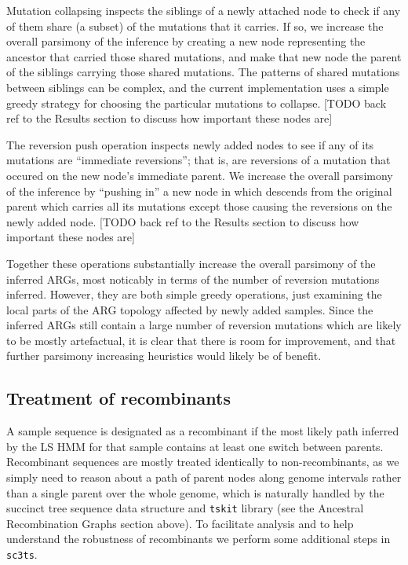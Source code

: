 \documentclass{article}
\begin{document}
Mutation collapsing inspects the siblings of a newly attached node
to check if any of them share (a subset) of the mutations that
it carries. If so, we increase the overall parsimony of the inference
by creating a new node representing the ancestor that carried
those shared mutations, and make that new node the parent of the
siblings carrying those shared mutations. The patterns of
shared mutations between siblings can be complex, and the current
implementation uses a simple greedy strategy for choosing
the particular mutations to collapse. [TODO back ref to the
Results section to discuss how important these nodes are]

The reversion push operation inspects newly added nodes to see
if any of its mutations are ``immediate reversions''; that is,
are reversions of a mutation that occured on the new node's
immediate parent. We increase the overall parsimony of the
inference by ``pushing in'' a new node in which descends from the
original parent which carries all its mutations except those
causing the reversions on the newly added node.
[TODO back ref to the
Results section to discuss how important these nodes are]

Together these operations substantially increase the overall parsimony
of the inferred ARGs, most noticably in terms of the number of
reversion mutations inferred. However, they are both simple
greedy operations, just examining the local parts of the
ARG topology affected by newly added samples. Since the inferred
ARGs still contain a large number of reversion mutations which
are likely to be mostly artefactual, it is clear that there
is room for improvement, and that further parsimony increasing
heuristics would likely be of benefit.

\subsection{Treatment of recombinants}
A sample sequence is designated as a recombinant if the most likely
path inferred by the LS HMM for that sample contains at least
one switch between parents. Recombinant sequences are mostly treated
identically to non-recombinants, as we simply need to reason about
a path of parent nodes along genome intervals rather than a
single parent over the whole genome, which is naturally handled by
the succinct tree sequence data structure and \texttt{tskit} library
(see the Ancestral Recombination Graphs section above). To facilitate
analysis and to help understand the robustness of recombinants
we perform some additional steps in \texttt{sc3ts}.
\end{document}
